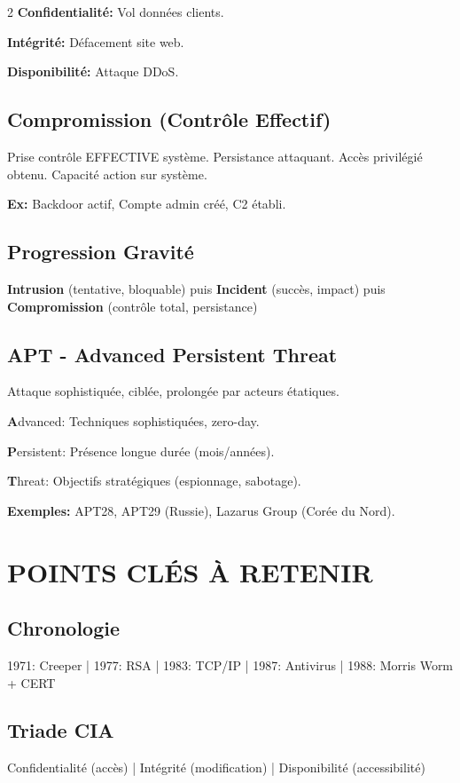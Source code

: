 \documentclass[9pt,a4paper]{extarticle}
\begin{document}
\begin{multicols}{2}
\textbf{Confidentialité:} Vol données clients.

\textbf{Intégrité:} Défacement site web.

\textbf{Disponibilité:} Attaque DDoS.

\subsection*{Compromission (Contrôle Effectif)}
Prise contrôle EFFECTIVE système. Persistance attaquant. Accès privilégié obtenu. Capacité action sur système.

\textbf{Ex:} Backdoor actif, Compte admin créé, C2 établi.

\subsection*{Progression Gravité}
\textbf{Intrusion} (tentative, bloquable) puis \textbf{Incident} (succès, impact) puis \textbf{Compromission} (contrôle total, persistance)

\subsection*{APT - Advanced Persistent Threat}
Attaque sophistiquée, ciblée, prolongée par acteurs étatiques.

\textbf{A}dvanced: Techniques sophistiquées, zero-day.

\textbf{P}ersistent: Présence longue durée (mois/années).

\textbf{T}hreat: Objectifs stratégiques (espionnage, sabotage).

\textbf{Exemples:} APT28, APT29 (Russie), Lazarus Group (Corée du Nord).

\section*{POINTS CLÉS À RETENIR}

\subsection*{Chronologie}
1971: Creeper | 1977: RSA | 1983: TCP/IP | 1987: Antivirus | 1988: Morris Worm + CERT

\subsection*{Triade CIA}
Confidentialité (accès) | Intégrité (modification) | Disponibilité (accessibilité)


\end{multicols}
\end{document}
